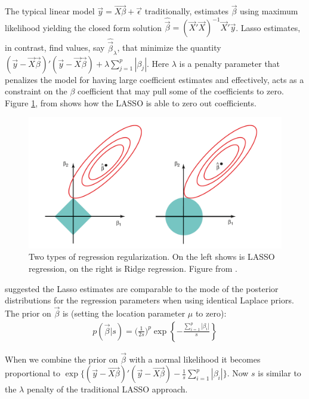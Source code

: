 The typical linear model $\vec{y}=\vec{X\beta} + \vec{\epsilon}$ traditionally,  estimates $\vec{\beta}$ using maximum likelihood yielding the closed form solution $\hat{\vec{\beta}}=(\vec{X}'\vec{X})^{-1}\vec{X}'\vec{y}$. Lasso estimates, in contrast, find values, say $\hat{\vec{\beta}}_\lambda$, that minimize the quantity $(\vec{y}-\vec{X}\vec{\beta})'(\vec{y}-\vec{X}\vec{\beta}) + \lambda \sum \limits_{j=1}^p |\beta_j|$. Here $\lambda$ is a penalty parameter that penalizes the model for having large coefficient estimates and effectively, acts as a constraint on the $\beta$ coefficient that may pull some of the coefficients to zero. Figure \ref{lasso}, from \citet{james2013} shows how the LASSO is able to zero out coefficients.
\begin{figure}[tb]
\centering
\includegraphics[width=.9\textwidth]{lasso.png}
\caption{Two types of regression regularization. On the left shows is LASSO regression, on the right is Ridge regression.  Figure from \citet{james2013}.}
\label{lasso}
\end{figure}

 
   \citet{casella08} suggested the Lasso estimates are comparable to the mode of the posterior distributions for the regression parameters when using identical Laplace priors. The prior on $\vec{\beta}$ is (setting the location parameter $\mu$ to zero):
  \begin{align}
p(\vec{\beta}| s) = \bigg(\frac{1}{2s}\bigg)^p \exp\left\{ -\frac{\sum\limits_{i=1}^p|\beta_i|}{s} \right\}
\label{laplace}
\end{align}
 
 \noindent When we combine the prior on $\vec{\beta}$ with a normal likelihood it becomes proportional to $\exp\bigg\{ (\vec{y}-\vec{X\beta})'(\vec{y}-\vec{X\beta}) -  \frac{1}{s}\sum \limits_{i=1}^p |\beta_i| \bigg\}$. Now $s$ is similar to the $\lambda$ penalty of the traditional LASSO approach.
 





